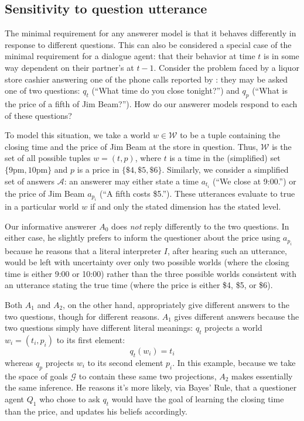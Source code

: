 \documentclass[12pt, floatsintext, jou]{apa6}
\begin{document}
\subsection{Sensitivity to question utterance}

The minimal requirement for any answerer model is that it behaves differently in response to different questions. This can also be considered a special case of the minimal requirement for a dialogue agent: that their behavior at time $t$ is in some way dependent on their partner's at $t-1$. %
Consider the problem faced by a liquor store cashier answering one of the phone calls reported by : they may be asked one of two questions: $q_t$ (``What time do you close tonight?'') and $q_p$ (``What is the price of a fifth of Jim Beam?''). How do our answerer models respond to each of these questions?

To model this situation, we take a world $w \in \mathcal{W}$ to be a tuple containing the closing time and the price of Jim Beam at the store in question. Thus, $\mathcal{W}$ is the set of all possible tuples $w = (t, p)$, where $t$ is a time in the (simplified) set $\{9\textrm{pm},10\textrm{pm}\}$ and $p$ is a price in $\{\$4, \$5, \$6\}$. Similarly, we consider a simplified set of answers $\mathcal{A}$: an answerer may either state a time $a_{t_i}$ (``We close at 9:00.'') or the price of Jim Beam $a_{p_i}$  (``A fifth costs \$5.''). These utterances evaluate to true in a particular world $w$ if and only the stated dimension has the stated level.

Our informative answerer $A_0$ does \emph{not} reply differently to the two questions. In either case, he slightly prefers to inform the questioner about the price using $a_{p_i}$ because he reasons that a literal interpreter $I$, after hearing such an utterance, would be left with uncertainty over only two possible worlds (where the closing time is either 9:00 or 10:00) rather than the three possible worlds consistent with an utterance stating the true time (where the price is either \$4, \$5, or \$6).

Both $A_1$ and $A_2$, on the other hand, appropriately give different answers to the two questions, though for different reasons. $A_1$ gives different answers because the two questions simply have different literal meanings: $q_t$ projects a world $w_i = (t_i, p_i)$ to its first element:$$q_t(w_i) = t_i$$ whereas $q_p$ projects $w_i$ to its second element $p_i$. In this example, because we take the space of goals $\mathcal{G}$ to contain these same two projections, $A_2$ makes essentially the same inference. He reasons it's more likely, via Bayes' Rule, that a questioner agent $Q_1$ who chose to ask $q_t$ would have the goal of learning the closing time than the price, and updates his beliefs accordingly.
\end{document}
